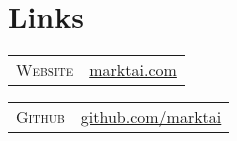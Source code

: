 \documentclass[a4paper,10pt]{article}
\begin{document}
\section{Links}

\begin{minipage}{0.48\textwidth}
\begin{tabular}{r|l}
 \textsc{Website} & \href{http://www.marktai.com}{marktai.com}\\
\end{tabular}
\end{minipage}%
\begin{minipage}{0.48\textwidth}
\begin{tabular}{r|l}
 \textsc{Github} & \href{https://www.github.com/marktai}{github.com/marktai}\\
\end{tabular}
\end{minipage}%



 
\end{document}
